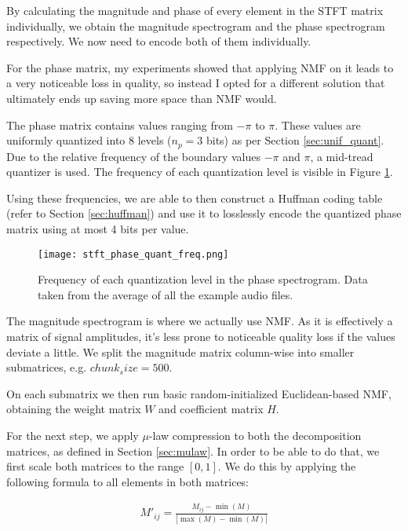 By calculating the magnitude and phase of every element in the STFT matrix individually, we obtain the magnitude spectrogram and the phase spectrogram respectively. We now need to encode both of them individually.

For the phase matrix, my experiments showed that applying NMF on it leads to a very noticeable loss in quality, so instead I opted for a different solution that ultimately ends up saving more space than NMF would.

The phase matrix contains values ranging from $-\pi$ to $\pi$. These values are uniformly quantized into 8 levels ($n_p = 3$ bits) as per Section \ref{sec:unif_quant}. Due to the relative frequency of the boundary values $-\pi$ and $\pi$, a mid-tread quantizer is used. The frequency of each quantization level is visible in Figure \ref{fig:stft_phase_quant_freq}.

Using these frequencies, we are able to then construct a Huffman coding table (refer to Section \ref{sec:huffman}) and use it to losslessly encode the quantized phase matrix using at most 4 bits per value.

\begin{figure}[ht]
	\caption[ANMF-STFT quantized phase frequencies]{Frequency of each quantization level in the phase spectrogram. Data taken from the average of all the example audio files.}
	\label{fig:stft_phase_quant_freq}
	\centering
	\texttt{[image: stft\_phase\_quant\_freq.png]}
\end{figure}

The magnitude spectrogram is where we actually use NMF. As it is effectively a matrix of signal amplitudes, it's less prone to noticeable quality loss if the values deviate a little. We split the magnitude matrix column-wise into smaller submatrices, e.g. $chunk_size = 500$.

On each submatrix we then run basic random-initialized Euclidean-based NMF, obtaining the weight matrix $W$ and coefficient matrix $H$.

For the next step, we apply $\mu$-law compression to both the decomposition matrices, as defined in Section \ref{sec:mulaw}. In order to be able to do that, we first scale both matrices to the range $[0, 1]$. We do this by applying the following formula to all elements in both matrices:

\begin{align}
M'_{ij} = \frac{M_{ij} - \min(M)}{|\max(M) - \min(M)|}
\end{align}

